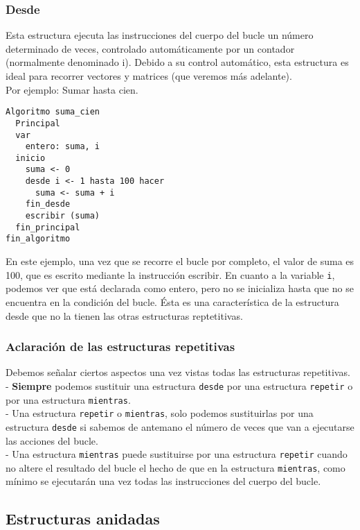 \documentclass[12pt,letterpaper]{article}
\begin{document}
\subsubsection{Desde}

Esta estructura ejecuta las instrucciones del cuerpo del bucle un número determinado de veces, controlado automáticamente por un contador (normalmente denominado i). Debido a su control automático, esta estructura es ideal para recorrer vectores y matrices (que veremos más adelante).\\
Por ejemplo: Sumar hasta cien.
\begin{lstlisting}
Algoritmo suma_cien
  Principal
  var
    entero: suma, i
  inicio
    suma <- 0
    desde i <- 1 hasta 100 hacer
      suma <- suma + i
    fin_desde
    escribir (suma)
  fin_principal
fin_algoritmo
\end{lstlisting}
En este ejemplo, una vez que se recorre el bucle por completo, el valor de suma es 100, que es escrito mediante la instrucción escribir. En cuanto a la variable \texttt{i}, podemos ver que está declarada como entero, pero no se inicializa hasta que no se encuentra en la condición del bucle. Ésta es una característica de la estructura desde que no la tienen las otras estructuras reptetitivas.

\subsubsection{Aclaración de las estructuras repetitivas}

Debemos señalar ciertos aspectos una vez vistas todas las estructuras repetitivas.\\
- \textbf{Siempre} podemos sustituir una estructura \texttt{desde} por una estructura \texttt{repetir} o por una estructura \texttt{mientras}.\\
- Una estructura \texttt{repetir} o \texttt{mientras}, solo podemos sustituirlas por una estructura \texttt{desde} si sabemos de antemano el número de veces que van a ejecutarse las acciones del bucle.\\
- Una estructura \texttt{mientras} puede sustituirse por una estructura \texttt{repetir} cuando no altere el resultado del bucle el hecho de que en la estructura \texttt{mientras}, como mínimo se ejecutarán una vez todas las instrucciones del cuerpo del bucle.

\subsection{Estructuras anidadas}
\end{document}

